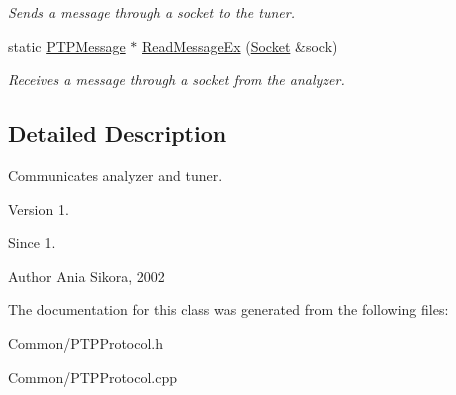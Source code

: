 \begin{DoxyCompactItemize}
\begin{DoxyCompactList}\small\item\em Sends a message through a socket to the tuner. \end{DoxyCompactList}\item 
\hypertarget{class_common_1_1_p_t_p_protocol_a2acbc4cc12fb8c0e846396ad17c62122}{static \hyperlink{class_common_1_1_p_t_p_message}{P\-T\-P\-Message} $\ast$ \hyperlink{class_common_1_1_p_t_p_protocol_a2acbc4cc12fb8c0e846396ad17c62122}{Read\-Message\-Ex} (\hyperlink{class_common_1_1_socket}{Socket} \&sock)}\label{class_common_1_1_p_t_p_protocol_a2acbc4cc12fb8c0e846396ad17c62122}

\begin{DoxyCompactList}\small\item\em Receives a message through a socket from the analyzer. \end{DoxyCompactList}\end{DoxyCompactItemize}


\subsection{Detailed Description}
Communicates analyzer and tuner. 

\begin{DoxyVersion}{Version}
1. 
\end{DoxyVersion}
\begin{DoxySince}{Since}
1. 
\end{DoxySince}
\begin{DoxyAuthor}{Author}
Ania Sikora, 2002 
\end{DoxyAuthor}


The documentation for this class was generated from the following files\-:\begin{DoxyCompactItemize}
\item 
Common/P\-T\-P\-Protocol.\-h\item 
Common/P\-T\-P\-Protocol.\-cpp\end{DoxyCompactItemize}
